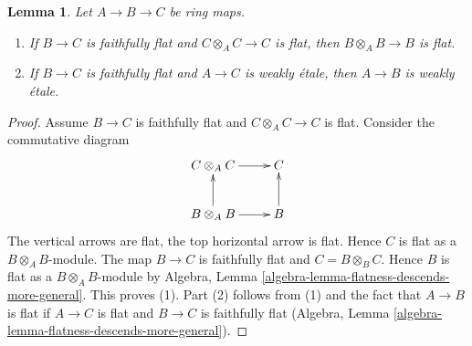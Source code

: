 \documentclass[10pt,a4paper]{amsart}
\theoremstyle{plain}
\newtheorem{lemma}[subsection]{Lemma}
\theoremstyle{definition}
\theoremstyle{remark}
\numberwithin{equation}{subsection}
\begin{document}
\begin{lemma}
\label{lemma-go-down}
Let $A \to B \to C$ be ring maps.
\begin{enumerate}
\item If $B \to C$ is faithfully flat and $C \otimes_A C \to C$ is flat,
then $B \otimes_A B \to B$ is flat.
\item If $B \to C$ is faithfully flat and $A \to C$ is weakly \'etale,
then $A \to B$ is weakly \'etale.
\end{enumerate}
\end{lemma}

\begin{proof}
Assume $B \to C$ is faithfully flat and $C \otimes_A C \to C$ is flat.
Consider the commutative diagram
$$
\xymatrix{
C \otimes_A C \ar[r] & C \\
B \otimes_A B \ar[r] \ar[u] & B \ar[u]
}
$$
The vertical arrows are flat, the top horizontal arrow is flat.
Hence $C$ is flat as a $B \otimes_A B$-module. The map $B \to C$ is
faithfully flat and $C = B \otimes_B C$. Hence $B$ is flat as a
$B \otimes_A B$-module by
Algebra, Lemma \ref{algebra-lemma-flatness-descends-more-general}.
This proves (1). Part (2) follows from (1) and the fact that
$A \to B$ is flat if $A \to C$ is flat and $B \to C$ is faithfully flat
(Algebra, Lemma \ref{algebra-lemma-flatness-descends-more-general}).
\end{proof}
\end{document}
